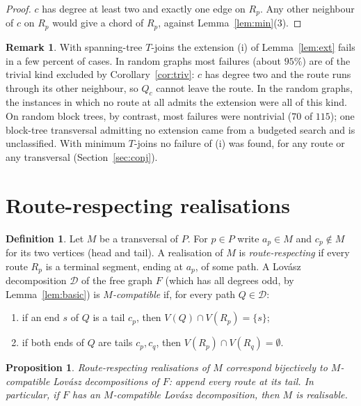 \documentclass[11pt]{amsart}
\newtheorem{proposition}[theorem]{Proposition}
\theoremstyle{definition}
\newtheorem{definition}[theorem]{Definition}
\newtheorem{remark}[theorem]{Remark}
\newcommand{\cD}{\mathcal D}
\begin{document}
\begin{proof}
$c$ has degree at least two and exactly one edge on $R_p$. Any other neighbour of $c$ on $R_p$ would give a
chord of $R_p$, against Lemma~\ref{lem:min}(3).
\end{proof}

\begin{remark}\label{rem:triv}
With spanning-tree $T$-joins the extension (i) of Lemma~\ref{lem:ext} fails in a few percent of cases.
In random graphs most failures (about $95\%$) are of the trivial kind excluded by
Corollary~\ref{cor:triv}: $c$ has degree two and the route runs through its other neighbour, so $Q_c$
cannot leave the route. In the random graphs, the instances in which no route at all admits the
extension were all of this kind. On random block trees, by contrast, most failures were nontrivial
($70$ of $115$); one block-tree transversal admitting no extension came from a budgeted search and is
unclassified. With minimum $T$-joins no failure of (i) was found, for any route or any transversal
(Section~\ref{sec:conj}).
\end{remark}

\section{Route-respecting realisations}\label{sec:rr}

\begin{definition}
Let $M$ be a transversal of $P$. For $p\in P$ write $a_p\in M$ and $c_p\notin M$ for its two vertices
(head and tail). A realisation of $M$ is \emph{route-respecting} if every route $R_p$ is a terminal
segment, ending at $a_p$, of some path. A Lov\'asz decomposition $\cD$ of the free graph $F$ (which has all
degrees odd, by Lemma~\ref{lem:basic}) is \emph{$M$-compatible} if, for every path $Q\in\cD$:
\begin{enumerate}
\item[(RR1)] if an end $s$ of $Q$ is a tail $c_p$, then $V(Q)\cap V(R_p)=\{s\}$;
\item[(RR2)] if both ends of $Q$ are tails $c_p,c_q$, then $V(R_p)\cap V(R_q)=\emptyset$.
\end{enumerate}
\end{definition}

\begin{proposition}\label{prop:rr}
Route-respecting realisations of $M$ correspond bijectively to $M$-compatible Lov\'asz decompositions of
$F$: append every route at its tail. In particular, if $F$ has an $M$-compatible Lov\'asz decomposition,
then $M$ is realisable.
\end{proposition}
\end{document}
